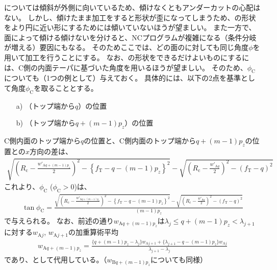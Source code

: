 \begin{\Columnname}{\CsideDimpleAngle}
\CfaceDimple については傾斜が外側に向いているため、傾けなくともアンダーカットの心配はない。
しかし、傾けたまま加工をすると形状が歪になってしまうため、\Dimple の形状をより円に近い形にするためには傾いていないほうが望ましい。
また一方で、面によって傾ける傾けないを分けると、NCプログラムが複雑になる（条件分岐が増える）要因にもなる。
そのためここでは、どの面の\Dimple に対しても同じ角度$\phi$を用いて加工を行うことにする。
\tcbline*
なお、\CfaceDimple の形状をできるだけよいものにするには、C側の内面テーパに基づいた角度を用いるほうが望ましい。
そのため、\CsideDimpleAngle$\phi_\mathrm C$についても（1つの例として）与えておく。
具体的には、以下の2点を基準として角度$\phi_\mathrm C$を取ることとする。
\begin{enumerate}
\item[a)] \CFaceDimpleFirstRow（トップ端から$q$）の位置
\item[b)] \CFaceDimpleLastRow（トップ端から$q+(m-1)p_z$）の位置
\end{enumerate}
C側内面のトップ端から$q$の位置と、C側内面のトップ端から$q+(m-1)p_z$の位置との$x$方向の差は、
\begin{align*}
  \sqrt{\left(R_\mathrm c-\frac{w'_{\mathrm Aq+(m-1)p_z}}2\right)^2
        -\left\{f_\mathrm T-q-(m-1)p_z\right\}^2}
  -\sqrt{\left(R_\mathrm c-\frac{w'_{\mathrm Aq}}2\right)^2-(f_\mathrm T-q)^2}
\end{align*}
これより、\CsideDimpleAngle$\phi_\mathrm C$ ($\phi_\mathrm C > 0$)は、
\begin{align*}
  \tan\phi_\mathrm C
  = \frac{\displaystyle
          \sqrt{\left(R_\mathrm c-\frac{w'_{\mathrm Aq+(m-1)p_z}}2\right)^2
                -\left\{f_\mathrm T-q-(m-1)p_z\right\}^2}
          -\sqrt{\left(R_\mathrm c-\frac{w'_{\mathrm Aq}}2\right)^2-(f_\mathrm T-q)^2}}
         {(m-1)p_z}
\end{align*}
で与えられる。
なお、前述の通り$w_{\mathrm Aq+(m-1)p_z}$は$\lambda_j \leq q+(m-1)p_z < \lambda_{j+1}$に対する$w_{\mathrm Aj}$, $w_{\mathrm Aj+1}$の加重算術平均
\begin{align*}
  w_{\mathrm Aq+(m-1)p_z}
  = \frac{\{q+(m-1)p_z-\lambda_j\}w_{\mathrm Aj+1}+\{\lambda_{j+1}-q-(m-1)p_z\}w_{\mathrm Aj}}
         {\lambda_{j+1}-\lambda_j}
\end{align*}
であり、\InnerDiameter として代用している。（$w_{\mathrm Bq+(m-1)p_z}$についても同様）
\end{\Columnname}


